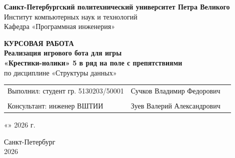 \documentclass[12pt,a4paper]{article}
\begin{document}
\begin{titlepage}
\centering
\vspace*{0.5cm}

{\large \textbf{Санкт-Петербургский политехнический университет Петра Великого}}\\
\vspace{0.2cm}
{\large Институт компьютерных наук и технологий}\\
\vspace{0.2cm}
{\large Кафедра «Программная инженерия»}

\vspace{1.2cm}
{\huge \textbf{КУРСОВАЯ РАБОТА}}\\
\vspace{0.4cm}
{\Large \textbf{Реализация игрового бота для игры\\«Крестики-нолики» 5 в ряд на поле с препятствиями}}\\
\vspace{0.4cm}
{\large по дисциплине «Структуры данных»}

\vspace{2cm}
\begin{tabular}{l l l}
Выполнил: студент гр. 5130203/50001 & \underline{\hspace{2cm}} \quad Сучков Владимир Федорович \\
          &                               & \small  \\[0.6cm]
Консультант: инженер ВШТИИ & \underline{\hspace{2cm}} \quad Зуев Валерий Александрович \\
\end{tabular}

\vspace{1cm}
«\underline{\hspace{0.8cm}}» \underline{\hspace{3.5cm}} 2026 г.

\vfill
{\large Санкт-Петербург}\\
{\large 2026}
\end{titlepage}

\tableofcontents
\newpage

\end{document}
